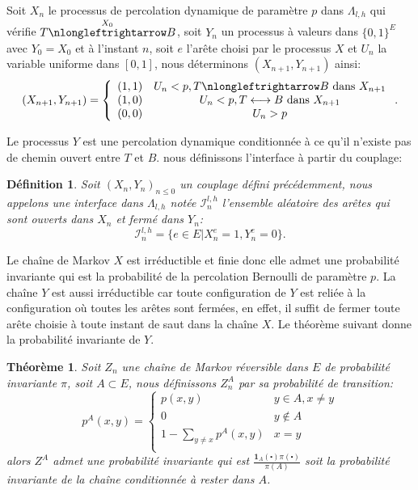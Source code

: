 \documentclass[titlepage,a4paper,12pt]{article}
\newcounter{def}
\newcounter{thm}
\newtheorem{interface}[def]{Définition}
\newtheorem{probainv}[thm]{Théorème}
\begin{document}
Soit $X_n$ le processus de percolation dynamique de paramètre $p$ dans $\Lambda_{l,h}$ qui vérifie $T\overset{X_0}{\nlongleftrightarrow}B$, soit $Y_n$ un processus à valeurs dans $\{0,1\}^E$ avec $Y_0=X_0$ et à l'instant $n$, soit $e$ l'arête choisi par le processus $X$ et $U_n$ la variable uniforme dans $[0,1]$, nous déterminons $(X_{n+1},Y_{n+1})$ ainsi:
$$(X_{n+1},Y_{n+1})=\left\lbrace \begin{array}{cc}
(1,1) & U_n<p,T\nlongleftrightarrow B \text{ dans } X_{n+1}\\
(1,0) & U_n<p,T\longleftrightarrow B \text{ dans } X_{n+1} \\
(0,0) & U_n>p\\
\end{array}\right..$$

Le processus $Y$ est une percolation dynamique conditionnée à ce qu'il n'existe pas de chemin ouvert entre $T$ et $B$. nous définissons l'interface à partir du couplage:
\begin{interface}
Soit $(X_n,Y_n)_{n\leqslant 0}$ un couplage défini précédemment, nous appelons une interface dans $\Lambda_{l,h}$ notée $\mathcal{I}^{l,h}_n$ l'ensemble aléatoire des arêtes qui sont ouverts dans $X_n$ et fermé dans $Y_n$: $$ \mathcal{I}^{l,h}_n = \big\{ e\in E| X_n^e = 1, Y_n^e = 0 \big\}.
$$
\end{interface}
Le chaîne de Markov $X$ est irréductible et finie donc elle admet une probabilité invariante qui est la probabilité de la percolation Bernoulli de paramètre $p$. La chaîne $Y$ est aussi irréductible car toute configuration de $Y$ est reliée à la configuration où toutes les arêtes sont fermées, en effet, il suffit de fermer toute arête choisie à toute instant de saut dans la chaîne $X$. Le théorème suivant donne la probabilité invariante de $Y$.
\begin{probainv}
Soit $Z_n$ une chaîne de Markov réversible dans $E$ de probabilité invariante $\pi$, soit $A\subset E$, nous définissons $Z_n^A$ par sa probabilité de transition:
$$p^A(x,y)=\left\lbrace \begin{array}{cc}
p(x,y) & y\in A, x\neq y \\
0 & y\notin A \\
1-\sum_{y\neq x}p^A(x,y) & x = y\\
\end{array}
\right.
$$
alors $Z^A$ admet une probabilité invariante qui est $\frac{\mathbf{1}_A(\centerdot)\pi(\centerdot)}{\pi(A)}$ soit la probabilité invariante de la chaîne conditionnée à rester dans $A$.
\end{probainv}
\end{document}
